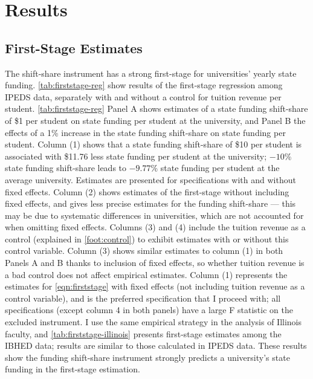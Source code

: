 \section{Results}
\label{sec:results}

\subsection{First-Stage Estimates}
\label{sec:results-firststage}
The shift-share instrument has a strong first-stage for universities' yearly state funding.
\autoref{tab:firststage-reg} show results of the first-stage regression among IPEDS data, separately with and without a control for tuition revenue per student.
\autoref{tab:firststage-reg} Panel A shows estimates of a state funding shift-share of \$1 per student on state funding per student at the university, and Panel B the effects of a 1\% increase in the state funding shift-share on state funding per student.
Column (1) shows that a state funding shift-share of \$10 per student is associated with \$11.76 less state funding per student at the university; $-10$\% state funding shift-share leads to $-9.77$\% state funding per student at the average university.
Estimates are presented for specifications with and without fixed effects.
Column (2) shows estimates of the first-stage without including fixed effects, and gives less precise estimates for the funding shift-share --- this may be due to systematic differences in universities, which are not accounted for when omitting fixed effects.
Columns (3) and (4) include the tuition revenue as a control (explained in \autoref{foot:control}) to exhibit estimates with or without this control variable.
Column (3) shows similar estimates to column (1) in both Panels A and B thanks to inclusion of fixed effects, so whether tuition revenue is a bad control does not affect empirical estimates.
Column (1) represents the estimates for \autoref{eqn:firststage} with fixed effects (not including tuition revenue as a control variable), and is the preferred specification that I proceed with;
all specifications (except column 4 in both panels) have a large F statistic on the excluded instrument.
I use the same empirical strategy in the analysis of Illinois faculty, and \autoref{tab:firststage-illinois} presents first-stage estimates among the IBHED data; results are similar to those calculated in IPEDS data.
These results show the funding shift-share instrument strongly predicts a university's state funding in the first-stage estimation.

